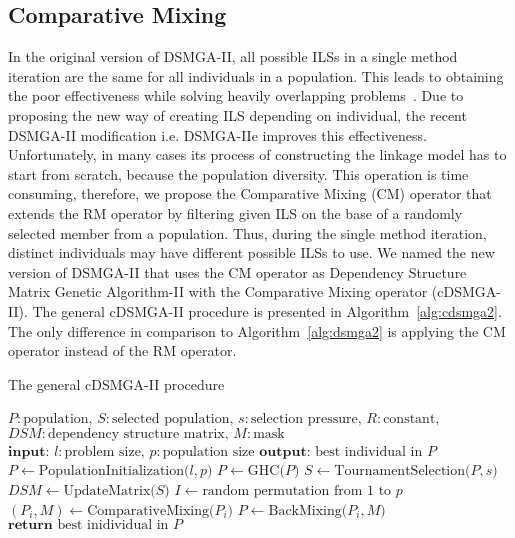 \subsection{Comparative Mixing}

In the original version of DSMGA-II, all possible ILSs in a single method iteration are the same for all individuals in a population. This leads to obtaining the poor effectiveness while solving heavily overlapping problems~\cite{fp3}. Due to proposing the new way of creating ILS depending on individual, the recent DSMGA-II modification i.e. DSMGA-IIe improves this effectiveness. Unfortunately, in many cases its process of constructing the linkage model has to start from scratch, because the population diversity. This operation is time consuming, therefore, we propose the Comparative Mixing (CM) operator that extends the RM operator by filtering given ILS on the base of a randomly selected member from a population. Thus, during the single method iteration, distinct individuals may have different possible ILSs to use. We named the new version of DSMGA-II that uses the CM operator as Dependency Structure Matrix Genetic Algorithm-II with the Comparative Mixing operator (cDSMGA-II). The general cDSMGA-II procedure is presented in Algorithm~\ref{alg:cdsmga2}. The only difference in comparison to Algorithm~\ref{alg:dsmga2} is applying the CM operator instead of the RM operator.

\begin{algorithm}
	\caption{The general cDSMGA-II procedure}
	\label{alg:cdsmga2}
	\begin{algorithmic}[1]
		\State $P: \text{population, } S: \text{selected population,}$
		\State $s: \text{selection pressure, } R: \text{constant,}$
		\State $DSM: \text{dependency structure matrix, } M: \text{mask}$
		\State $\textbf{input: } l: \text{problem size, } p: \text{population size}$
		\State $\textbf{output: } \text{best individual in } P$
		\State $P \gets \text{PopulationInitialization($l, p$)}$
		\State $P \gets \text{GHC($P$)}$
		\State $S \gets \text{TournamentSelection($P, s$)}$
		\State $DSM \gets \text{UpdateMatrix($S$)}$
		\State $I \gets \text{random permutation from $1$ to $p$}$
		\State $(P_i, M) \gets \text{ComparativeMixing($P_i$)}$
		\State $P \gets \text{BackMixing($P_i, M$)}$
		\EndIf
		\EndFor
		\EndFor
		\EndWhile
		\State $\textbf{return } \text{best inidividual in } P$
	\end{algorithmic}
\end{algorithm}


